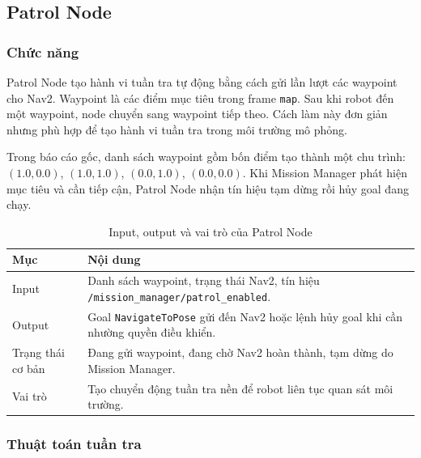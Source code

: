 \subsection{Patrol Node}
\label{subsec:patrol-node}

\subsubsection{Chức năng}
\label{subsubsec:patrol-node-function}

Patrol Node tạo hành vi tuần tra tự động bằng cách gửi lần lượt các waypoint cho Nav2. Waypoint là các điểm mục tiêu trong frame \texttt{map}. Sau khi robot đến một waypoint, node chuyển sang waypoint tiếp theo. Cách làm này đơn giản nhưng phù hợp để tạo hành vi tuần tra trong môi trường mô phỏng.

Trong báo cáo gốc, danh sách waypoint gồm bốn điểm tạo thành một chu trình: $(1.0, 0.0)$, $(1.0, 1.0)$, $(0.0, 1.0)$, $(0.0, 0.0)$. Khi Mission Manager phát hiện mục tiêu và cần tiếp cận, Patrol Node nhận tín hiệu tạm dừng rồi hủy goal đang chạy.

\begin{table}[H]
    \centering
    \caption{Input, output và vai trò của Patrol Node}
    \label{tab:patrol-node-io}
    \renewcommand{\arraystretch}{1.25}
    \small
    \begin{tabularx}{\textwidth}{|>{\raggedright\arraybackslash}p{}|>{\raggedright\arraybackslash}X|}
        \hline
        \textbf{Mục} & \textbf{Nội dung} \\
        \hline
        Input & Danh sách waypoint, trạng thái Nav2, tín hiệu \texttt{/mission\_manager/patrol\_enabled}. \\
        \hline
        Output & Goal \texttt{NavigateToPose} gửi đến Nav2 hoặc lệnh hủy goal khi cần nhường quyền điều khiển. \\
        \hline
        Trạng thái cơ bản & Đang gửi waypoint, đang chờ Nav2 hoàn thành, tạm dừng do Mission Manager. \\
        \hline
        Vai trò & Tạo chuyển động tuần tra nền để robot liên tục quan sát môi trường. \\
        \hline
    \end{tabularx}
\end{table}

\subsubsection{Thuật toán tuần tra}
\label{subsubsec:patrol-algorithm}

